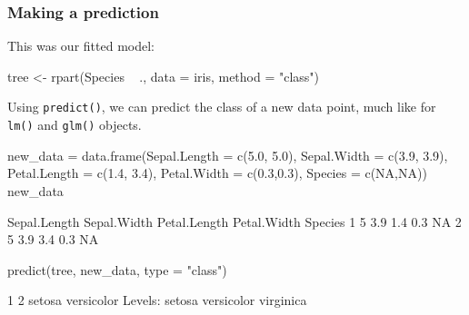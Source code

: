 \documentclass[a4paper]{article}
\begin{document}
\subsubsection{Making a prediction}
This was our fitted model:
\begin{Schunk}
\begin{Sinput}
tree <- rpart(Species ~ ., data = iris, method = "class") 
\end{Sinput}
\end{Schunk}
Using \lstinline|predict()|, we can predict the class of a new data point, much like for \lstinline|lm()| and \lstinline|glm()| objects.
\begin{Schunk}
\begin{Sinput}
new_data = data.frame(Sepal.Length = c(5.0, 5.0), 
                      Sepal.Width = c(3.9, 3.9),
                      Petal.Length = c(1.4, 3.4), 
                      Petal.Width = c(0.3,0.3),
                      Species = c(NA,NA))
new_data
\end{Sinput}
\begin{Soutput}
  Sepal.Length Sepal.Width Petal.Length Petal.Width Species
1            5         3.9          1.4         0.3      NA
2            5         3.9          3.4         0.3      NA
\end{Soutput}
\begin{Sinput}
predict(tree, new_data, type = "class")
\end{Sinput}
\begin{Soutput}
         1          2 
    setosa versicolor 
Levels: setosa versicolor virginica
\end{Soutput}
\end{Schunk}
\end{document}

